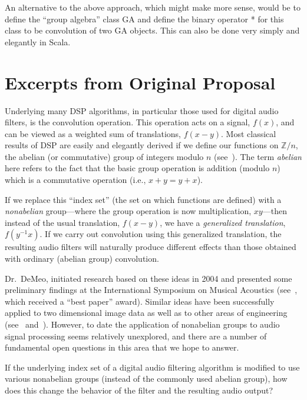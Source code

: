 \documentclass{article}
\begin{document}
An alternative to the above approach, which might make more sense, would be to
define the ``group algebra'' class GA and define the binary operator * for this
class to be convolution of two GA objects.  This can also be done very simply
and elegantly in Scala.



\appendix

\section{Excerpts from Original Proposal}

Underlying many \ac{DSP} algorithms, in particular those
used for digital audio filters, is the convolution operation.  This operation
acts on a signal, $f(x)$, and can be viewed as a weighted sum of translations,
$f(x-y)$. Most classical results of \ac{DSP} are easily and elegantly derived if we
define our functions on $\mathbb{Z}/n$, the abelian (or commutative) group of
integers modulo $n$ (see~\cite{Tolimieri:1998}).
  The term \emph{abelian} here refers to the fact that the basic
group operation is addition (modulo $n$) which is a commutative operation (i.e.,
$x+y = y+x$).

If we replace this ``index set'' (the set on which functions are defined) with a
\emph{nonabelian} group---where the group operation is now multiplication,
$xy$---then instead of the usual translation, $f(x-y)$, we have a
\emph{generalized translation}, $f(y^{-1}x)$. 
If we carry out convolution using this generalized translation, the
resulting audio filters will naturally produce different effects than those
obtained with ordinary (abelian group) convolution.  


Dr.~DeMeo, initiated research based on these ideas in
2004 and presented some preliminary findings at the International Symposium on Musical
Acoustics (see~\cite{nonabeliandsp}, which received a ``best paper'' award).
Similar ideas have been successfully applied to two dimensional image data
as well as to other areas of engineering (see~\cite{Chirikjian:2002}
and~\cite{Tolimieri:2003}).  However, to date the application of 
nonabelian groups to audio signal processing seems relatively unexplored, and
there are a number of fundamental open questions in this area that we hope to
answer.  
 
\vskip5mm

If the underlying index set of a digital audio filtering algorithm is modified
to use various nonabelian groups (instead of the commonly used abelian group),
how does this change the behavior of the filter and the resulting audio output?
\end{document}
